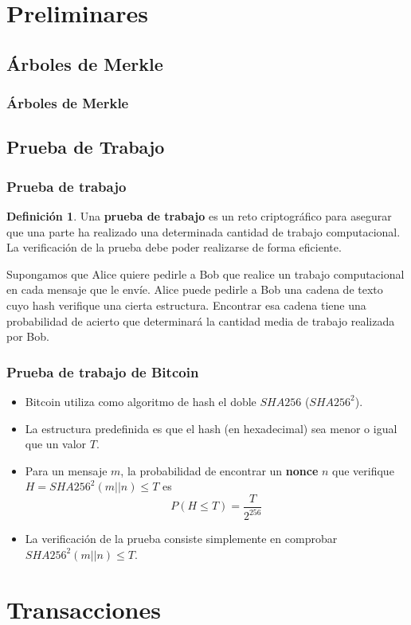 \documentclass{beamer}
\theoremstyle{definition}
\newtheorem{defi}{Definición}
\begin{document}
\section{Preliminares}
\subsection{Árboles de Merkle}

\begin{frame}
	\frametitle{Árboles de Merkle}
\end{frame}

\subsection{Prueba de Trabajo}
\begin{frame}
\frametitle{Prueba de trabajo}
\begin{defi}
	Una \textbf{prueba de trabajo} es un reto criptográfico para asegurar que una parte ha realizado una determinada cantidad de trabajo computacional. La verificación de la prueba debe poder realizarse de forma eficiente.
\end{defi}\pause

Supongamos que Alice quiere pedirle a Bob que realice un trabajo computacional en cada mensaje que le envíe. Alice puede pedirle a Bob una cadena de texto cuyo hash verifique una cierta estructura. Encontrar esa cadena tiene una probabilidad de acierto que determinará la cantidad media de trabajo realizada por Bob.
\end{frame}

\begin{frame}
	\frametitle{Prueba de trabajo de Bitcoin}
	\begin{itemize}
	\item<1-> Bitcoin utiliza como algoritmo de hash el doble $SHA256$ ($SHA256^2$).
	\item<2-> La estructura predefinida es que el hash (en hexadecimal) sea menor o igual que un valor $T$.
	\item<3-> Para un mensaje $m$, la probabilidad de encontrar un \textbf{nonce} $n$ que verifique $H=SHA256^2(m||n)\leq T$ es
	$$P(H\leq T)=\frac{T}{2^{256}}$$
	\item<4-> La verificación de la prueba consiste simplemente en comprobar $SHA256^2(m||n)\leq T$.
	\end{itemize}
\end{frame}


\section{Transacciones}
\end{document}

